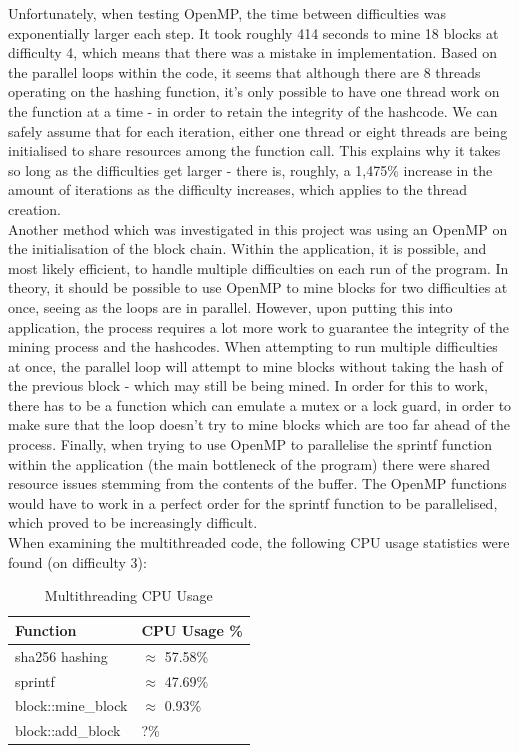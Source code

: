 \documentclass[12pt, a4paper]{article}
\begin{document}
Unfortunately, when testing OpenMP, the time between difficulties was exponentially larger each step. It took roughly 414 seconds to mine 18 blocks at difficulty 4, which means that there was a mistake in implementation. Based on the parallel loops within the code, it seems that although there are 8 threads operating on the hashing function, it's only possible to have one thread work on the function at a time - in order to retain the integrity of the hashcode. We can safely assume that for each iteration, either one thread or eight threads are being initialised to share resources among the function call. This explains why it takes so long as the difficulties get larger - there is, roughly, a 1,475\% increase in the amount of iterations as the difficulty increases, which applies to the thread creation. \\
Another method which was investigated in this project was using an OpenMP on the initialisation of the block chain. Within the application, it is possible, and most likely efficient, to handle multiple difficulties on each run of the program. In theory, it should be possible to use OpenMP to mine blocks for two difficulties at once, seeing as the loops are in parallel. However, upon putting this into application, the process requires a lot more work to guarantee the integrity of the mining process and the hashcodes. When attempting to run multiple difficulties at once, the parallel loop will attempt to mine blocks without taking the hash of the previous block - which may still be being mined. In order for this to work, there has to be a function which can emulate a mutex or a lock guard, in order to make sure that the loop doesn't try to mine blocks which are too far ahead of the process. Finally, when trying to use OpenMP to parallelise the sprintf function within the application (the main bottleneck of the program) there were shared resource issues stemming from the contents of the buffer. The OpenMP functions would have to work in a perfect order for the sprintf function to be parallelised, which proved to be increasingly difficult. \\
When examining the multithreaded code, the following CPU usage statistics were found (on difficulty 3): \\

\begin{table}[H]
    \centering
    \begin{tabular}{| l | l |}
    \hline
    Function & CPU Usage \%  \\ \hline
    sha256 hashing & $\approx$ 57.58\% \\ \hline
    sprintf & $\approx$ 47.69\% \\ \hline
    block::mine\_block & $\approx$ 0.93\% \\ \hline
    block::add\_block & ?\% \\ \hline
    \end{tabular}
    \caption{Multithreading CPU Usage}
\end{table}
\end{document}
